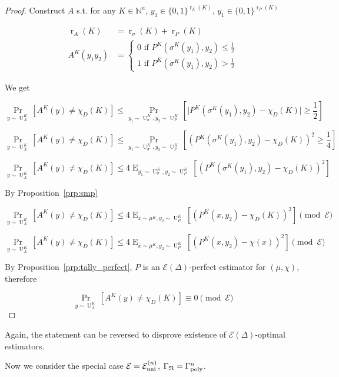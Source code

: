 \documentclass{article}
\numberwithin{equation}{section}
\theoremstyle{definition}
\theoremstyle{plain}
\newcommand{\Bool}{\{0,1\}}
\DeclareMathOperator{\Prb}{Pr}
\DeclareMathOperator{\E}{E}
\DeclareMathOperator{\R}{r}
\DeclareMathOperator{\Un}{U}
\newcommand{\Nats}{\mathbb{N}}
\newcommand{\Abs}[1]{\lvert #1 \rvert}
\newcommand{\GrowR}{\Gamma_{\mathfrak{R}}}
\newcommand{\Fall}{\mathcal{E}}
\newcommand{\BoolR}[1]{\Bool^{\R_{#1}(K)}}
\newcommand{\GammaPoly}{\Gamma_{\textnormal{poly}}}
\newcommand{\FallU}{{\Fall_{\textnormal{uni}}^{(n)}}}
\begin{document}
\begin{proof}

Construct ${A}$ s.t. for any ${K \in \Nats^n}$, ${y_1 \in \BoolR{L}}$, ${y_1 \in \BoolR{P}}$

\begin{align*}
\R_A(K) &= \R_\sigma(K)+\R_P(K) \\
A^K(y_1 y_2) &= \begin{cases}0 \text{ if } P^K(\sigma^K(y_1),y_2) \leq \frac{1}{2} \\ 1 \text{ if } P^K(\sigma^K(y_1),y_2) > \frac{1}{2} \end{cases}
\end{align*}

We get

\[\Prb_{y \sim \Un_A^K}[A^K(y) \neq \chi_D(K)] \leq \Prb_{y_1 \sim \Un_\sigma^K,y_2 \sim \Un_P^K}[\Abs{P^K(\sigma^K(y_1),y_2) - \chi_D(K)} \geq \frac{1}{2}]\]

\[\Prb_{y \sim \Un_A^K}[A^K(y) \neq \chi_D(K)] \leq \Prb_{y_1 \sim \Un_\sigma^K,y_2 \sim \Un_P^K}[(P^K(\sigma^K(y_1),y_2) - \chi_D(K))^2 \geq \frac{1}{4}]\]

\[\Prb_{y \sim \Un_A^K}[A^K(y) \neq \chi_D(K)] \leq 4 \E_{y_1 \sim \Un_\sigma^K,y_2 \sim \Un_P^K}[(P^K(\sigma^K(y_1),y_2) - \chi_D(K))^2]\]

By Proposition~\ref{prp:smp}

\[\Prb_{y \sim \Un_A^K}[A^K(y) \neq \chi_D(K)] \leq 4 \E_{x \sim \mu^K,y_2 \sim \Un_P^K}[(P^K(x,y_2) - \chi_D(K))^2] \pmod \Fall\]

\[\Prb_{y \sim \Un_A^K}[A^K(y) \neq \chi_D(K)] \leq 4 \E_{x \sim \mu^K,y_2 \sim \Un_P^K}[(P^K(x,y_2) - \chi(x))^2] \pmod \Fall\]

By Proposition~\ref{prp:tally_perfect}, ${P}$ is an ${\Fall(\Delta)}$-perfect estimator for ${(\mu,\chi)}$, therefore

\[\Prb_{y \sim \Un_A^K}[A^K(y) \neq \chi_D(K)] \equiv 0 \pmod \Fall\]
%
\end{proof}

Again, the statement can be reversed to disprove existence of ${\Fall(\Delta)}$-optimal estimators.

Now we consider the special case ${\Fall=\FallU}$, ${\GrowR = \GammaPoly^n}$. 
\end{document}
